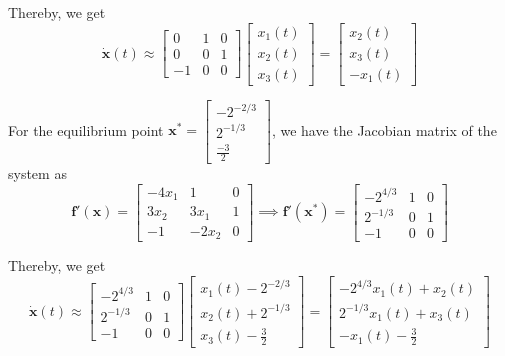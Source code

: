 Thereby, we get
\[
    \mathbf{\dot x}(t) \approx
    \begin{bmatrix}
        0  & 1 & 0 \\
        0  & 0 & 1 \\
        -1 & 0 & 0
    \end{bmatrix}
    \begin{bmatrix}
        x_1(t) \\
        x_2(t) \\
        x_3(t)
    \end{bmatrix}
    =
    \boxed{
        \begin{bmatrix}
            x_2(t) \\
            x_3(t) \\
            -x_1(t)
        \end{bmatrix}
    }
\]

For the equilibrium point \( \mathbf{x^*} = \begin{bmatrix} -2^{-2/3} \\ 2^{-1/3} \\ \frac{-3}{2} \end{bmatrix} \), we have the Jacobian matrix of the system as
\[
    \mathbf{f'}(\mathbf{x}) =
    \begin{bmatrix}
        -4x_1 & 1     & 0 \\
        3x_2  & 3x_1  & 1 \\
        -1    & -2x_2 & 0
    \end{bmatrix}
    \implies
    \mathbf{f'}(\mathbf{x^*}) =
    \begin{bmatrix}
        -2^{4/3} & 1 & 0 \\
        2^{-1/3} & 0 & 1 \\
        -1       & 0 & 0
    \end{bmatrix}
\]

Thereby, we get
\[
    \mathbf{\dot x}(t) \approx
    \begin{bmatrix}
        -2^{4/3} & 1 & 0 \\
        2^{-1/3} & 0 & 1 \\
        -1       & 0 & 0
    \end{bmatrix}
    \begin{bmatrix}
        x_1(t) - 2^{-2/3} \\
        x_2(t) + 2^{-1/3} \\
        x_3(t) - \frac{3}{2}
    \end{bmatrix}
    =
    \boxed{
        \begin{bmatrix}
            -2^{4/3}x_1(t) + x_2(t) \\
            2^{-1/3}x_1(t) + x_3(t) \\
            -x_1(t) - \frac{3}{2}
        \end{bmatrix}
    }
\]
